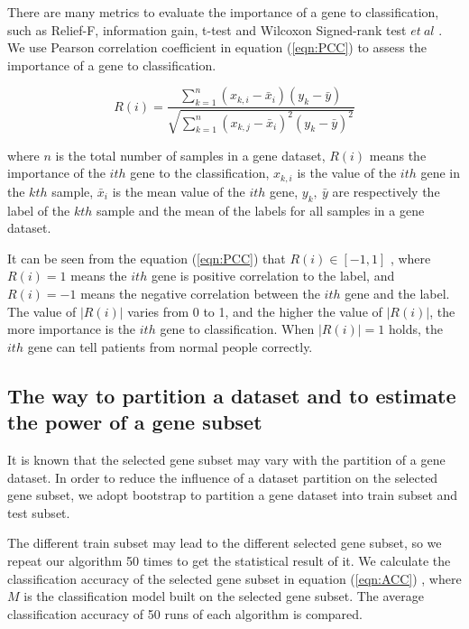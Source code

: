 \documentclass[runningheads,a4paper]{llncs}
\begin{document}
There are many metrics to evaluate the importance of a gene to classification, such as Relief-F, information gain, t-test and Wilcoxon Signed-rank test $et~al$ \cite{guyon2002gene,xjy2014}. We use Pearson correlation coefficient in equation (\ref{eqn:PCC}) to assess the importance of a gene to classification. 

\begin{equation}\label{eqn:PCC}
R(i) = \frac{ \sum\limits_{k=1}^{n}(x_{k,i}-\bar{x}_i)(y_k-\bar{y})}{\sqrt{\sum\limits_{k=1}^{n}(x_{k,j}-\bar{x}_i)^2(y_k-\bar{y})^2}}
\end{equation}

where $n$ is the total number of samples in a gene dataset, $R(i)$ means the importance of the $ith$ gene to the classification, $x_{k,i}$  is the value of the $ith$ gene in the $kth$ sample, $\bar{x}_{i}$  is the mean value of the $ith$ gene, $y_k,~\bar{y}$ are respectively the label of the $kth$ sample and the mean of the labels for all samples in a gene dataset. 

It can be seen from the equation (\ref{eqn:PCC}) that $R(i)\in [-1,1]$ , where $R(i)=1$ means the $ith$ gene is positive correlation to the label, and $R(i)= -1$ means the negative correlation between the $ith$ gene and the label. The value of $|R(i)|$ varies from 0 to 1, and the higher the value of  $|R(i)|$, the more importance is the $ith$ gene to classification. When $|R(i)|=1$ holds, the $ith$ gene can tell patients from normal people correctly.

\subsection{The way to partition a dataset and to estimate the power of a gene subset}

It is known that the selected gene subset may vary with the partition of a gene dataset. In order to reduce the influence of a dataset partition on the selected gene subset, we adopt bootstrap \cite{han2006data} to partition a gene dataset into train subset and test subset.

The different train subset may lead to the different selected gene subset, so we repeat our algorithm 50 times to get the statistical result of it. We calculate the classification accuracy of the selected gene subset in equation (\ref{eqn:ACC}) \cite{han2006data}, where $M$ is the classification model built on the selected gene subset. The average classification accuracy of 50 runs of each algorithm is compared.
\end{document}
